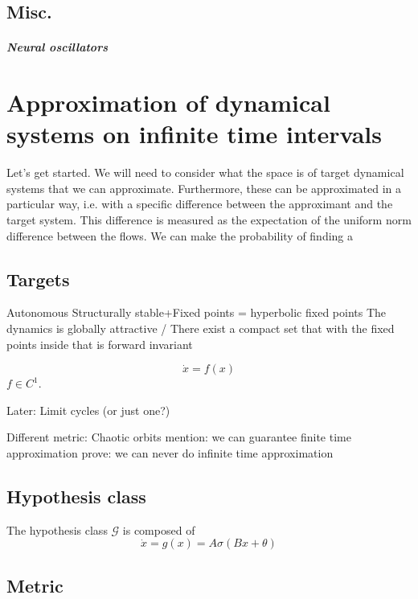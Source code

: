 \documentclass{article}
\theoremstyle{definition}
\theoremstyle{remark}
\begin{document}
\subsection{Misc.}

\subparagraph{Neural oscillators}
\citep{lanthaler2023neuraloscillators}




\section{Approximation of dynamical systems on infinite time intervals}
Let's get started.
We will need to consider what the space is of target dynamical systems that we can approximate.
Furthermore, these can be approximated in a particular way, i.e. with a specific difference between the approximant and the target system.
This difference is measured as the expectation of the uniform norm difference between the flows. We can make the probability of finding a 



\subsection{Targets}
Autonomous
Structurally stable+Fixed points = hyperbolic fixed points
The dynamics is globally attractive / There exist a compact set that with the fixed points inside that is forward invariant 

\begin{equation}
\dot x = f(x)
\end{equation}
$f\in C^1$.



Later: Limit cycles (or just one?)



Different metric: Chaotic orbits
mention: we can guarantee finite time approximation
prove: we can never do infinite time approximation 


\subsection{Hypothesis class}
The hypothesis class $\mathcal{G}$ is composed of
\begin{equation}
\dot x = g(x) = A\sigma(Bx+\theta)
\end{equation}


\subsection{Metric}
\end{document}

